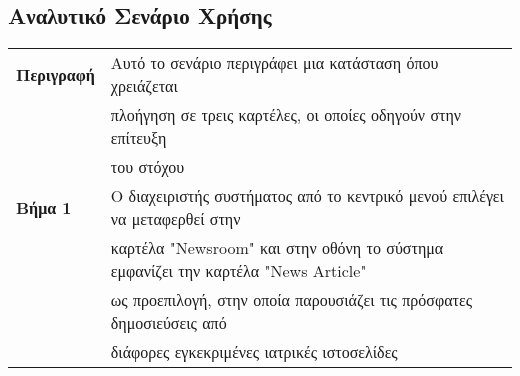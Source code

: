 \documentclass{article}
\newcommand\T{\rule{0pt}{2.6ex}}       %
\newcommand\B{\rule[-1.2ex]{0pt}{0pt}}
\begin{document}
\subsection{ Αναλυτικό Σενάριο Χρήσης}

\begin{center}
    \begin{tabular}{|l|l|}
    \hline
      \textbf{Περιγραφή} & Αυτό το σενάριο περιγράφει μια κατάσταση όπου χρειάζεται \T \\& πλοήγηση σε τρεις καρτέλες, οι οποίες οδηγούν στην επίτευξη \\& του στόχου \B \\ 
      \hline
      \textbf{Βήμα 1} & Ο διαχειριστής συστήματος από το κεντρικό μενού επιλέγει να μεταφερθεί στην \T \\& καρτέλα "Newsroom" και στην οθόνη το σύστημα εμφανίζει την καρτέλα  "News Article" \\& ως προεπιλογή, στην οποία παρουσιάζει τις πρόσφατες δημοσιεύσεις από \\& διάφορες εγκεκριμένες ιατρικές ιστοσελίδες \B \\
      \hline
    \end{tabular}
\end{center}
 
\end{document}
